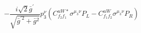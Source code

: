 %
\begin{dmath*}
%
  -  \frac{i \sqrt{2} {\bar g}^\prime}{\sqrt{{\bar g}^{\prime 2} + {\bar g}{}^2}} p_3^{\nu} \left(C^{uW*}_{f_2 f_1} \sigma^{\mu_3 \nu } P_L  - C^{uW}_{f_1 f_2} \sigma^{\mu_3 \nu } P_R \right)
%
\end{dmath*}
%
